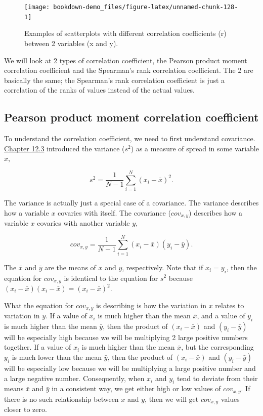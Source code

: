 \documentclass[
  openany]{krantz}
\begin{document}
\begin{figure}
\texttt{[image: bookdown-demo\_files/figure-latex/unnamed-chunk-128-1]} \caption{Examples of scatterplots with different correlation coefficients (r) between 2 variables (x and y).}\label{fig:unnamed-chunk-128}
\end{figure}

We will look at 2 types of correlation coefficient, the Pearson product moment correlation coefficient and the Spearman's rank correlation coefficient.
The 2 are basically the same; the Spearman's rank correlation coefficient is just a correlation of the ranks of values instead of the actual values.

\hypertarget{pearson-product-moment-correlation-coefficient}{%
\subsection{Pearson product moment correlation coefficient}\label{pearson-product-moment-correlation-coefficient}}

To understand the correlation coefficient, we need to first understand covariance.
\protect\hyperlink{the-variance}{Chapter 12.3} introduced the variance (\(s^{2}\)) as a measure of spread in some variable \(x\),

\[s^{2} = \frac{1}{N - 1}\sum_{i = 1}^{N}\left(x_{i} - \bar{x} \right)^{2}.\]

The variance is actually just a special case of a covariance.
The variance describes how a variable \(x\) covaries with itself.
The covariance (\(cov_{x,y}\)) describes how a variable \(x\) covaries with another variable \(y\),

\[cov_{x, y} = \frac{1}{N - 1} \sum_{i = 1}^{N}\left(x_{i} - \bar{x} \right) \left(y_{i} - \bar{y} \right).\]

The \(\bar{x}\) and \(\bar{y}\) are the means of \(x\) and \(y\), respectively.
Note that if \(x_{i} = y_{i}\), then the equation for \(cov_{x,y}\) is identical to the equation for \(s^{2}\) because \(\left(x_{i} - \bar{x} \right) \left(x_{i} - \bar{x} \right) = \left(x_{i} - \bar{x} \right)^{2}\).

What the equation for \(cov_{x,y}\) is describing is how the variation in \(x\) relates to variation in \(y\).
If a value of \(x_{i}\) is much higher than the mean \(\bar{x}\), and a value of \(y_{i}\) is much higher than the mean \(\bar{y}\), then the product of \(\left(x_{i} - \bar{x} \right)\) and \(\left(y_{i} - \bar{y} \right)\) will be especially high because we will be multiplying 2 large positive numbers together.
If a value of \(x_{i}\) is much higher than the mean \(\bar{x}\), but the corresponding \(y_{i}\) is much lower than the mean \(\bar{y}\), then the product of \(\left(x_{i} - \bar{x} \right)\) and \(\left(y_{i} - \bar{y} \right)\) will be especially low because we will be multiplying a large positive number and a large negative number.
Consequently, when \(x_{i}\) and \(y_{i}\) tend to deviate from their means \(\bar{x}\) and \(\bar{y}\) in a consistent way, we get either high or low values of \(cov_{x,y}\).
If there is no such relationship between \(x\) and \(y\), then we will get \(cov_{x,y}\) values closer to zero.
\end{document}

